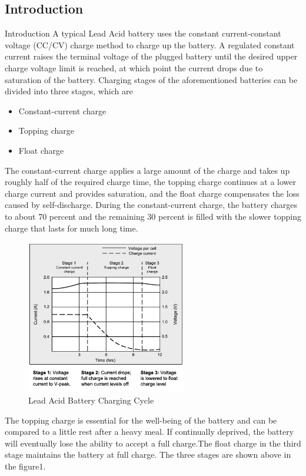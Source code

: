 \documentclass[a4paper,12pt]{article}
\begin{document}
\begin{multicols}{2}
\section{Introduction}
Introduction
A typical Lead Acid battery uses the constant current-constant voltage (CC/CV) charge method to charge up the battery. A regulated constant current raises the terminal voltage of the plugged battery until the desired upper charge voltage limit is reached, at which point the current drops due to saturation of the battery. Charging stages of the aforementioned batteries can be divided into three stages, which are
\begin{itemize}
    \item Constant-current charge
    \item Topping charge
    \item Float charge 
\end{itemize}
The constant-current charge applies a large amount of the charge and takes up roughly half of the required charge time, the topping charge continues at a lower charge current and provides saturation, and the float charge compensates the loss caused by self-discharge. During the constant-current charge, the battery charges to about 70 percent and the remaining 30 percent is filled with the slower topping charge that lasts for much long time.
\begin{figure}[H]
    \centering
    \includegraphics[width=7cm]{battery_charging.jpg}
    \caption{Lead Acid Battery Charging Cycle}
    \label{fig:battery_charging}
\end{figure}
\columnbreak The topping charge is essential for the well-being of the battery and can be compared to a little rest after a heavy meal. If continually deprived, the battery will eventually lose the ability to accept a full charge.The float charge in the third stage maintains the battery at full charge. The three stages are shown above in the figure1.

\end{multicols}
\end{document}
